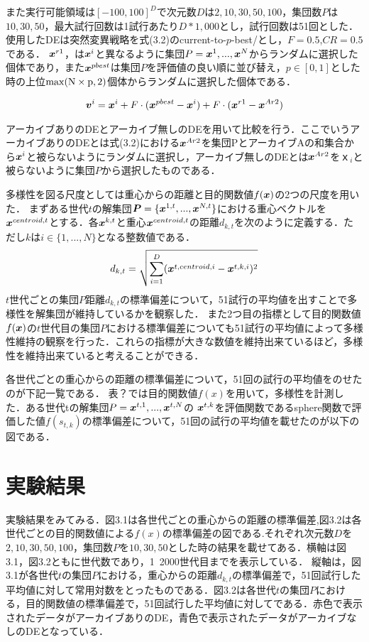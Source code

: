 \documentclass[a4paper,11pt,oneside,openany]{jsbook}
\def\vector#1{\mbox{\boldmath $#1$}}
\begin{document}
また実行可能領域は$[-100, 100]^D$で次元数$D$は$2,10,30,50,100$，集団数$P$は$10,30,50$，最大試行回数は1試行あたり$D*1,000$とし，試行回数は51回とした．使用したDEは突然変異戦略を式(3.2)のcurrent-to-$p$-best/とし，$F=0.5$,$CR=0.5$である．
$\vector{x}^{r1}$，は${\vector{x}^i}$と異なるように集団$P = {\vector{x}^1, ..., \vector{x}^N}$からランダムに選択した個体であり，また$\vector{x}^{pbest}$は集団$P$を評価値の良い順に並び替え，${p\in[0,1]}$とした時の上位$\rm{max}(N \times p, 2)$個体からランダムに選択した個体である．

\begin{eqnarray}
\vector{v}^{i} = \vector{x}^{i} + F\cdot(\vector{x}^{pbest} - \vector{x}^{i}) + F\cdot(\vector{x}^{r1} - \vector{x}^{Ar2})
\end{eqnarray}

アーカイブありのDEとアーカイブ無しのDEを用いて比較を行う．ここでいうアーカイブありのDEとは式(3.2)における$\vector{x}^{Ar2}$を集団PとアーカイブAの和集合から${\vector{x}^i}$と被らないようにランダムに選択し，アーカイブ無しのDEとは$\vector{x}^{Ar2}$を$ｘ_{i}$と被らないように集団$P$から選択したものである．

多様性を図る尺度としては重心からの距離と目的関数値$f(\vector{x})$の2つの尺度を用いた．
まずある世代$t$の解集団$\vector{P} = \{ \vector{x}^{1,t}, ..., \vector{x}^{N,t} \}$における重心ベクトルを$\vector{x}^{centroid,t}$とする．各$\vector{x}^{k,t}$と重心$\vector{x}^{centroid,t}$の距離$d_{k,t}$を次のように定義する．ただし$k$は$i \in \{1, ..., N\}$となる整数値である．
\begin{eqnarray}
d_{k,t} = \sqrt{\sum_{i=1}^{D} (\vector{x}^{t,centroid,i} - \vector{x}^{t,k,i})^2} 
\end{eqnarray}
$t$世代ごとの集団$P$距離$d_{k,t}$の標準偏差について，51試行の平均値を出すことで多様性を解集団が維持しているかを観察した．
また2つ目の指標として目的関数値$f(\vector{x})$の$t$世代目の集団$P$における標準偏差についても51試行の平均値によって多様性維持の観察を行った．これらの指標が大きな数値を維持出来ているほど，多様性を維持出来ていると考えることができる．


各世代ごとの重心からの距離の標準偏差について，51回の試行の平均値をのせたのが下記一覧である．
表？では目的関数値$f(x)$を用いて，多様性を計測した．ある世代tの解集団$P = {\vector{x}^{t,1}, ..., \vector{x}^{t,N}}$の $\vector{x}^{t,k}$を評価関数であるsphere関数で評価した値$f(s_{t,k})$の標準偏差について，51回の試行の平均値を載せたのが以下の図である．

\section{実験結果}
実験結果をみてみる．図3.1は各世代ごとの重心からの距離の標準偏差,図3.2は各世代ごとの目的関数値による$f(x)$の標準偏差の図である.それぞれ次元数$D$を$2,10,30,50,100$，集団数$P$を$10,30,50$とした時の結果を載せてある．横軸は図3.1，図3.2ともに世代数であり，1~2000世代目までを表示している．
縦軸は，図3.1が各世代$t$の集団$P$における，重心からの距離$d_{k,t}$の標準偏差で，51回試行した平均値に対して常用対数をとったものである．図3.2は各世代$t$の集団$P$における，目的関数値の標準偏差で，51回試行した平均値に対してである．赤色で表示されたデータがアーカイブありのDE，青色で表示されたデータがアーカイブなしのDEとなっている．
\end{document}
